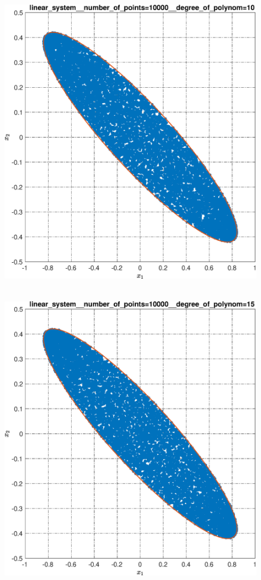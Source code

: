 \documentclass[../main.tex]{subfiles}
\begin{document}
\begin{figure}[ht!]
\begin{minipage}[b]{.3\linewidth}
  		\includegraphics[width=\linewidth]{images/linear_system__number_of_points=10000__degree_of_polynom=10.eps}
  	\end{minipage} 
  	\hfill
  	\begin{minipage}[b]{.3\linewidth} 
  		\small
  		\centering
  		\includegraphics[width=\linewidth]{images/linear_system__number_of_points=10000__degree_of_polynom=15.eps}

\end{minipage}
\end{figure}
\end{document}
